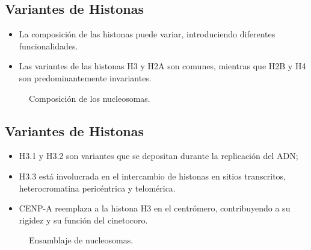 \documentclass[
  letterpaper,
  DIV=11,
  numbers=noendperiod]{scrartcl}
\providecommand{\tightlist}{%
  \setlength{\itemsep}{0pt}\setlength{\parskip}{0pt}}\usepackage{longtable,booktabs,array}
\begin{document}
\subsection{Variantes de Histonas}\label{variantes-de-histonas}

\begin{itemize}
\tightlist
\item
  La composición de las histonas puede variar, introduciendo diferentes
  funcionalidades.
\item
  Las variantes de las histonas H3 y H2A son comunes, mientras que H2B y
  H4 son predominantemente invariantes.
\end{itemize}

\begin{figure}[H]

{\centering 

}

\caption{Composición de los nucleosomas.}

\end{figure}%

\subsection{Variantes de Histonas}\label{variantes-de-histonas-1}

\begin{itemize}
\tightlist
\item
  H3.1 y H3.2 son variantes que se depositan durante la replicación del
  ADN;
\item
  H3.3 está involucrada en el intercambio de histonas en sitios
  transcritos, heterocromatina pericéntrica y telomérica.
\item
  CENP-A reemplaza a la histona H3 en el centrómero, contribuyendo a su
  rigidez y su función del cinetocoro.
\end{itemize}

\begin{figure}[H]

{\centering 

}

\caption{Ensamblaje de nucleosomas.}

\end{figure}%
\end{document}
